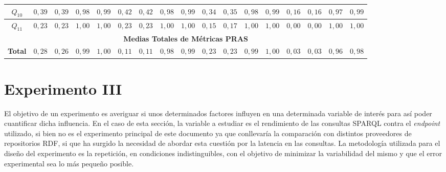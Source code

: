 \documentclass[a4paper,final,11pt,fleqn,twoside]{book}  %
\begin{document}
\begin{table}
\begin{tabular}{|c||c|c|c|c||c|c|c|c||c|c|c|c||c|c|c|c|}
$Q_{10}$  &$0,39$ & $0,39$ & $0,98$ & $0,99$ & 		$0,42$ & $0,42$ & $0,98$ & $0,99$ & 	$0,34$ & $0,35$ & $0,98$ & $0,99$ & 	$0,16$ & $0,16$ & $0,97$ & $0,99$ \\ \hline
$Q_{11}$  &$0,23$ & $0,23$ & $1,00$ & $1,00$ & 		$0,23$ & $0,23$ & $1,00$ & $1,00$ & 	$0,15$ & $0,17$ & $1,00$ & $1,00$ & 	$0,00$ & $0,00$ & $1,00$ & $1,00$ \\ \hline
\multicolumn{17}{|c|}{\textbf{Medias Totales de Métricas PRAS}} \\ \hline
\textbf{Total}  &$0,28$ & $0,26$ & $0,99$ & $1,00$ & 	$0,11$ & $0,11$ & $0,98$ & $0,99$ & 	$0,23$ & $0,23$ & $0,99$ & $1,00$ & 	$0,03$ & $0,03$ & $0,96$ & $0,98$ \\ \hline
\hline
 \end{tabular}

 \end{table} 
  
\section{Experimento III}
El objetivo de un experimento es averiguar si unos determinados factores influyen en una determinada variable de interés para así poder cuantificar dicha influencia. En el caso 
de esta sección, la variable a estudiar es el rendimiento de las consultas \gls{SPARQL} contra el \textit{endpoint} utilizado, si bien 
no es el experimento principal de este documento ya que conllevaría la comparación con distintos proveedores de 
repositorios \gls{RDF}, si que ha surgido la necesidad de abordar esta cuestión por la latencia en las consultas. La metodología utilizada 
para el diseño del experimento es la repetición, en condiciones indistinguibles, con el objetivo de minimizar la variabilidad 
del mismo y que el error experimental sea lo más pequeño posible.
\end{document}

